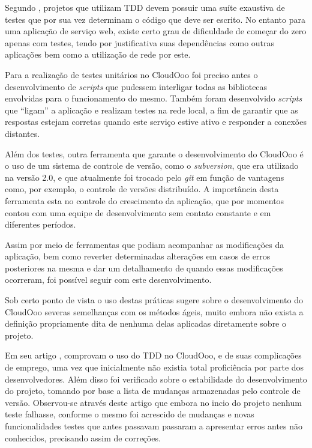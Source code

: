 Segundo \cite{ASTELS}, projetos que utilizam TDD devem possuir uma suíte exaustiva de testes que por sua vez determinam o código que deve ser escrito. No entanto para uma aplicação de serviço web, existe certo grau de dificuldade de começar do zero apenas com testes, tendo por justificativa suas dependências como outras aplicações bem como a utilização de rede por este. 

Para a realização de testes unitários no CloudOoo foi preciso antes o desenvolvimento de \textit{scripts} que pudessem interligar todas as bibliotecas envolvidas para o funcionamento do mesmo. Também foram desenvolvido \textit{scripts} que ``ligam'' a aplicação e realizam testes na rede local, a fim de garantir que as respostas estejam corretas quando este serviço estive ativo e responder a conexões distantes.

Além dos testes, outra ferramenta que garante o desenvolvimento do CloudOoo é o uso de um sistema de controle de versão, como o \textit{subversion}, que era utilizado na versão 2.0, e que atualmente foi trocado pelo \textit{git} em função de vantagens como, por exemplo, o controle de versões distribuído. A importância desta ferramenta esta no controle do crescimento da aplicação, que por momentos contou com uma equipe de desenvolvimento sem contato constante e em diferentes períodos.

Assim por meio de ferramentas que podiam acompanhar as modificações da aplicação, bem como reverter determinadas alterações em casos de erros posteriores na mesma e dar um detalhamento de quando essas modificações ocorreram, foi possível seguir com este desenvolvimento.

Sob certo ponto de vista o uso destas práticas sugere sobre o desenvolvimento do CloudOoo severas semelhanças com os métodos ágeis, muito embora não exista a definição propriamente dita de nenhuma delas aplicadas diretamente sobre o projeto.

Em seu artigo \cite{SILVA-MONNERAT-CARVALHO}, comprovam o uso do TDD no CloudOoo, e de suas complicações de emprego, uma vez que inicialmente não existia total proficiência por parte dos desenvolvedores. Além disso foi verificado sobre o estabilidade do desenvolvimento do projeto, tomando por base a lista de mudanças armazenadas pelo controle de versão. Observou-se através deste artigo que embora no incio do projeto nenhum teste falhasse, conforme o mesmo foi acrescido de mudanças e novas funcionalidades testes que antes passavam passaram a apresentar erros antes não conhecidos, precisando assim de correções.


